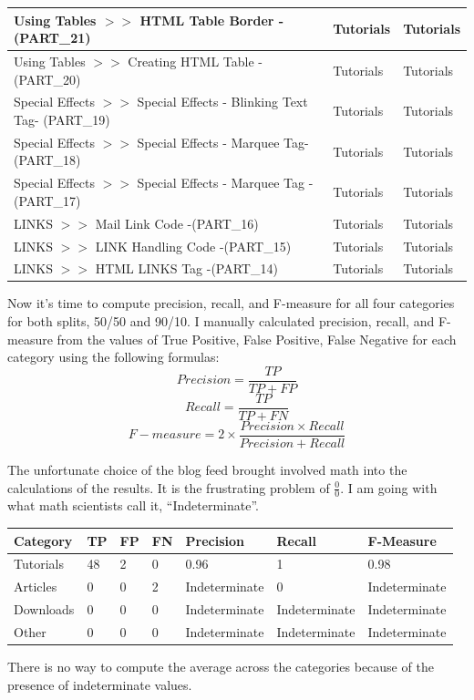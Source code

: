 \documentclass[a4paper, 11pt]{article}
\begin{document}
\begin{longtable}{ |p{10cm}|p{2cm}|p{2cm}| }
Using Tables $>>$ HTML Table Border - (PART\_21)
&
Tutorials
&
Tutorials \\
\hline
Using Tables $>>$ Creating HTML Table - (PART\_20)
&
Tutorials
&
Tutorials \\
\hline
Special Effects $>>$ Special Effects - Blinking Text Tag- (PART\_19)
&
Tutorials
&
Tutorials \\
\hline
Special Effects $>>$ Special Effects - Marquee Tag- (PART\_18)
&
Tutorials
&
Tutorials \\
\hline
Special Effects $>>$ Special Effects - Marquee Tag -(PART\_17)
&
Tutorials
&
Tutorials \\
\hline
LINKS $>>$ Mail Link Code -(PART\_16)
&
Tutorials
&
Tutorials \\
\hline
LINKS $>>$ LINK Handling Code  -(PART\_15)
&
Tutorials
&
Tutorials \\
\hline
LINKS  $>>$   HTML LINKS Tag  -(PART\_14)
&
Tutorials
&
Tutorials \\
\hline
\end{longtable}

Now it's time to compute precision, recall, and F-measure for all four categories for both splits, 50/50 and 90/10. I manually calculated precision, recall, and F-measure from the values of True Positive, False Positive, False Negative for each category using the following formulas:
$$
Precision = \frac{TP}{TP+FP}
$$
$$
Recall = \frac{TP}{TP+FN}
$$
$$
F-measure = 2\times\frac{Precision \times Recall}{Precision + Recall}
$$

The unfortunate choice of the blog feed brought involved math into the calculations of the results. It is the frustrating problem of $\frac{0}{0}$. I am going with what math scientists call it, ``Indeterminate''.

\begin{longtable}{ |p{2cm}|p{0.5cm}|p{0.5cm}|p{0.5cm}|p{2.5cm}|p{2.5cm}|p{2.5cm}| }
\hline
Category
&
TP
&
FP
&
FN
&
Precision
&
Recall
&
F-Measure \\
\hline
Tutorials
&
48
&
2
&
0
&
0.96
&
1
&
0.98 \\
\hline
Articles
&
0
&
0
&
2
&
Indeterminate
&
0
&
Indeterminate \\
\hline
Downloads
&
0
&
0
&
0
&
Indeterminate
&
Indeterminate
&
Indeterminate \\
\hline
Other
&
0
&
0
&
0
&
Indeterminate
&
Indeterminate
&
Indeterminate \\
\hline
\end{longtable}

There is no way to compute the average across the categories because of the presence of indeterminate values.
\end{document}
